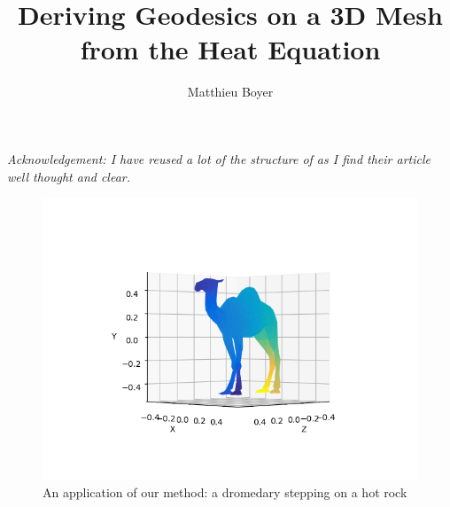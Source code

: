\documentclass[math, info, english]{cours}
\title{Deriving Geodesics on a 3D Mesh from the Heat Equation}
\author{Matthieu Boyer}
\begin{document}
\bettertitle

\emph{Acknowledgement: I have reused a lot of the structure of \cite{heatgeodesics} as I find their article well thought and clear.}

\begin{figure}[h]
	\centering
	\includegraphics[width=\textwidth]{Figures/camel_t=10_i=100_False.png}
	\caption{An application of our method: a dromedary stepping on a hot rock}
\end{figure}
\end{document}
